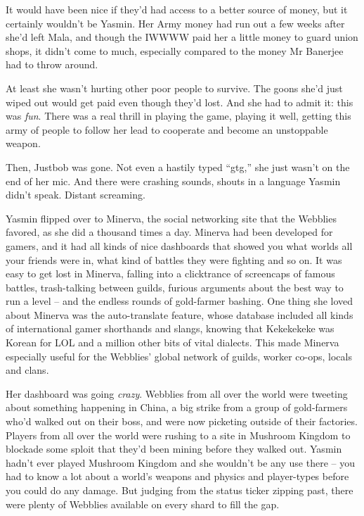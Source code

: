 It would have been nice if they'd had access to a better source of
money, but it certainly wouldn't be Yasmin. Her Army money had run
out a few weeks after she'd left Mala, and though the IWWWW paid
her a little money to guard union shops, it didn't come to much,
especially compared to the money Mr Banerjee had to throw around.

At least she wasn't hurting other poor people to survive. The goons
she'd just wiped out would get paid even though they'd lost. And
she had to admit it: this was \emph{fun}. There was a real thrill
in playing the game, playing it well, getting this army of people
to follow her lead to cooperate and become an unstoppable weapon.

Then, Justbob was gone. Not even a hastily typed ``gtg,'' she just
wasn't on the end of her mic. And there were crashing sounds,
shouts in a language Yasmin didn't speak. Distant screaming.

Yasmin flipped over to Minerva, the social networking site that the
Webblies favored, as she did a thousand times a day. Minerva had
been developed for gamers, and it had all kinds of nice dashboards
that showed you what worlds all your friends were in, what kind of
battles they were fighting and so on. It was easy to get lost in
Minerva, falling into a clicktrance of screencaps of famous
battles, trash-talking between guilds, furious arguments about the
best way to run a level -- and the endless rounds of gold-farmer
bashing. One thing she loved about Minerva was the auto-translate
feature, whose database included all kinds of international gamer
shorthands and slangs, knowing that Kekekekeke was Korean for LOL
and a million other bits of vital dialects. This made Minerva
especially useful for the Webblies' global network of guilds,
worker co-ops, locals and clans.

Her dashboard was going \emph{crazy}. Webblies from all over the
world were tweeting about something happening in China, a big
strike from a group of gold-farmers who'd walked out on their boss,
and were now picketing outside of their factories. Players from all
over the world were rushing to a site in Mushroom Kingdom to
blockade some sploit that they'd been mining before they walked
out. Yasmin hadn't ever played Mushroom Kingdom and she wouldn't be
any use there -- you had to know a lot about a world's weapons and
physics and player-types before you could do any damage. But
judging from the status ticker zipping past, there were plenty of
Webblies available on every shard to fill the gap.

